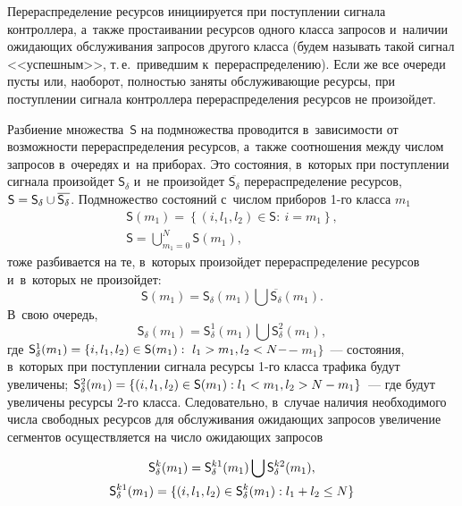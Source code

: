 \begin{multicols}{2}
  Перераспределение ресурсов инициируется при поступлении сигнала 
контроллера, а~также простаивании ресурсов одного класса запросов 
и~наличии ожидающих обслуживания запросов другого класса (будем называть 
такой сигнал <<успешным>>, т.\,е.\ приведшим к~перераспределению). Если же 
все очереди пусты или, наоборот, полностью заняты обслуживающие ресурсы, 
при поступлении сигнала контроллера перераспределения ресурсов не 
произойдет.
  
  Разбиение множества~$\mathsf{S}$ на подмножества проводится 
в~зависимости от возможности перераспределения ресурсов, а~также 
соотношения между числом запросов в~очередях и~на приборах. 
Это состояния, в~которых при поступлении сигнала произойдет $\mathsf{S}_\delta$ и~не 
произойдет $\overline{\mathsf{S}_\delta}$ перераспределение ресурсов, 
$\mathsf{S}\hm= \mathsf{S}_\delta \cup \overline{\mathsf{S}_\delta}$. 
Подмножество со\-сто\-яний с~числом приборов 1-го класса $m_1$
\begin{gather*}
\mathsf{S}(m_1)= \left\{ (i,l_1,l_2)\in \mathsf{S}:\ i=m_1\right\}, \\
\mathsf{S}= \mathop{\bigcup}\limits_{m_1=0}^N \mathsf{S}\left(m_1\right),
\end{gather*}
 тоже разбивается на 
те, в~которых произойдет перераспределение ресурсов и~в~которых не произойдет: 
  $$
  \mathsf{S}(m_1)= \mathsf{S}_\delta (m_1)\bigcup 
\overline{\mathsf{S}_\delta}\left(m_1\right).
$$
%
 В~свою очередь, 
 $$
 \mathsf{S}_\delta  (m_1)= \mathsf{S}^1_\delta (m_1)\bigcup \mathsf{S}_\delta^2(m_1),
 $$
  где 
$\mathsf{S}_\delta^1(m_1)= \{ i,l_1,l_2)\hm\in \mathsf{S}(m_1):\ l_1\hm> 
m_1, l_2\hm< N\hm-$\linebreak $-\;m_1\}$~--- состояния, в~которых при поступлении 
сигнала ресурсы 1-го класса трафика будут увеличены; 
$\mathsf{S}_\delta^2(m_1)\hm= \{ (i,l_1,l_2)\hm\in \mathsf{S}(m_1): l_1\hm< 
m_1, l_2\hm>N\hm-m_1\}$~--- где будут увеличены ресурсы 2-го класса. 
Следовательно, в~случае наличия необходимого числа свободных ресурсов для 
обслуживания ожидающих запросов увеличение сегментов осуществляется на 
число ожидающих запросов

\vspace*{-5pt} 

\noindent
\begin{multline*}
\mathsf{S}_\delta^k(m_1)= \mathsf{S}_\delta^{k1}(m_1)\bigcup \mathsf{S}_\delta^{k2}(m_1),\\ 
\mathsf{S}_\delta^{k1}(m_1)\hm= \{(i,l_1,l_2)\hm\in \mathsf{S}_\delta^k(m_1): 
l_1\hm+ l_2\hm\leq N\}
\end{multline*}



\end{multicols}
